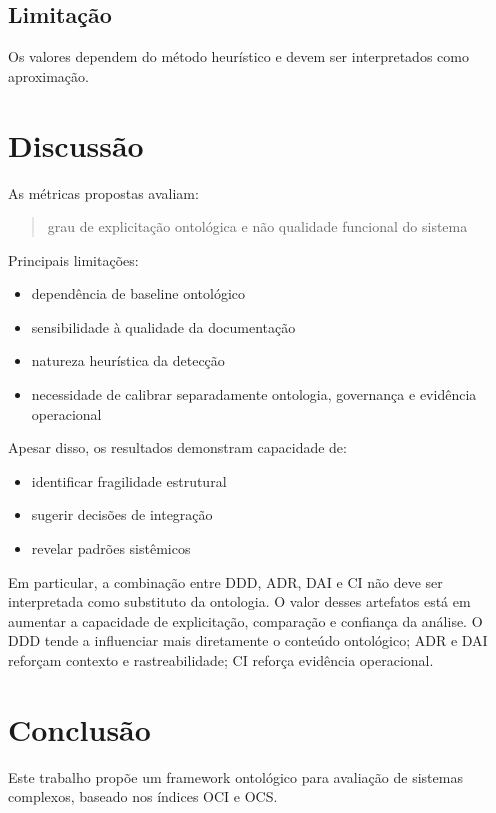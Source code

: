 \documentclass[12pt,a4paper]{article}
\begin{document}
\subsection{Limitação}

Os valores dependem do método heurístico e devem ser interpretados como aproximação.

	\section{Discussão}
As métricas propostas avaliam:

\begin{quote}
	grau de explicitação ontológica e não qualidade funcional do sistema
\end{quote}

Principais limitações:

\begin{itemize}
	\item dependência de baseline ontológico
	\item sensibilidade à qualidade da documentação
	\item natureza heurística da detecção
	\item necessidade de calibrar separadamente ontologia, governança e evidência operacional
\end{itemize}

Apesar disso, os resultados demonstram capacidade de:

\begin{itemize}
	\item identificar fragilidade estrutural
	\item sugerir decisões de integração
	\item revelar padrões sistêmicos
\end{itemize}

Em particular, a combinação entre DDD, ADR, DAI e CI não deve ser interpretada como substituto da ontologia. O valor desses artefatos está em aumentar a capacidade de explicitação, comparação e confiança da análise. O DDD tende a influenciar mais diretamente o conteúdo ontológico; ADR e DAI reforçam contexto e rastreabilidade; CI reforça evidência operacional.
		\section{Conclusão}

	Este trabalho propõe um framework ontológico para avaliação de sistemas complexos, baseado nos índices OCI e OCS.
\end{document}
